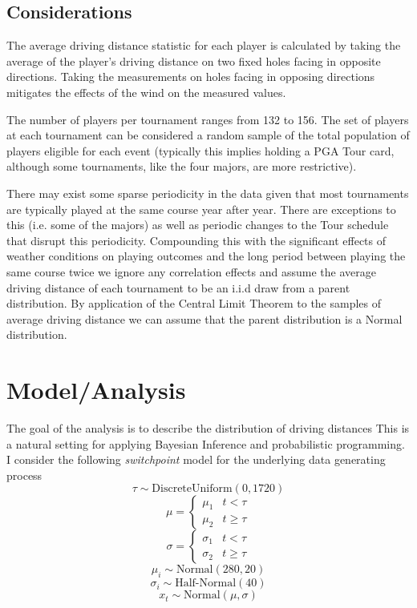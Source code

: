 \documentclass[11pt]{article}
\begin{document}
\begin{multicols}{2}
\subsection{Considerations}
The average driving distance statistic for each player is calculated by taking the average of the player's driving distance on two fixed holes facing in opposite directions. Taking the measurements on holes facing in opposing directions mitigates the effects of the wind on the measured values. 
\par The number of players per tournament ranges from 132 to 156. The set of players at each tournament can be considered a random sample of the total population of players eligible for each event (typically this implies holding a PGA Tour card, although some tournaments, like the four majors, are more restrictive).
\par There may exist some sparse periodicity in the data given that most tournaments are typically played at the same course year after year. There are exceptions to this (i.e. some of the majors) as well as periodic changes to the Tour schedule that disrupt this periodicity. Compounding this with the significant effects of weather conditions on playing outcomes and the long period between playing the same course twice we ignore any correlation effects and assume the average driving distance of each tournament to be an i.i.d draw from a parent distribution. By application of the Central Limit Theorem to the samples of average driving distance we can assume that the parent distribution is a Normal distribution.
\section{Model/Analysis}
The goal of the analysis is to describe the distribution of driving distances This is a natural setting for applying Bayesian Inference and probabilistic programming. I consider the following \textit{switchpoint} model for the underlying data generating process
$$ \tau \sim \text{DiscreteUniform}(0,1720)$$
$$ \mu = \begin{cases}
    \mu_1 & t < \tau\\
    \mu_2 & t \geq \tau
\end{cases}$$
$$ \sigma = \begin{cases}
    \sigma_1 & t < \tau\\
    \sigma_2 & t \geq \tau
\end{cases}$$
$$ \mu_i \sim \text{Normal}(280,20)$$
$$ \sigma_i \sim \text{Half-Normal}(40)$$
$$ x_t \sim \text{Normal}(\mu, \sigma)$$
\end{multicols}
\end{document}
